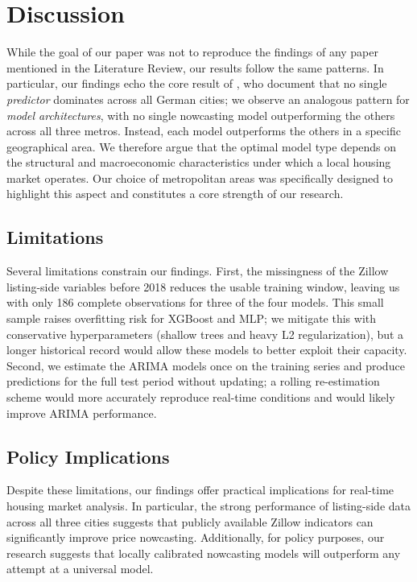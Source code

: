 \section{Discussion}

While the goal of our paper was not to reproduce the findings of any paper mentioned in the Literature Review, our results follow the same patterns. In particular, our findings echo the core result of \citet{kholodilin2014business}, who document that no single \emph{predictor} dominates across all German cities; we observe an analogous pattern for \emph{model architectures}, with no single nowcasting model outperforming the others across all three metros. Instead, each model outperforms the others in a specific geographical area. We therefore argue that the optimal model type depends on the structural and macroeconomic characteristics under which a local housing market operates. Our choice of metropolitan areas was specifically designed to highlight this aspect and constitutes a core strength of our research.

\subsection{Limitations}
Several limitations constrain our findings. First, the missingness of the Zillow listing-side variables before 2018 reduces the usable training window, leaving us with only 186 complete observations for three of the four models. This small sample raises overfitting risk for XGBoost and MLP; we mitigate this with conservative hyperparameters (shallow trees and heavy L2 regularization), but a longer historical record would allow these models to better exploit their capacity. Second, we estimate the ARIMA models once on the training series and produce predictions for the full test period without updating; a rolling re-estimation scheme would more accurately reproduce real-time conditions and would likely improve ARIMA performance.

\subsection{Policy Implications}
Despite these limitations, our findings offer practical implications for real-time housing market analysis. In particular, the strong performance of listing-side data across all three cities suggests that publicly available Zillow indicators can significantly improve price nowcasting. Additionally, for policy purposes, our research suggests that locally calibrated nowcasting models will outperform any attempt at a universal model.


